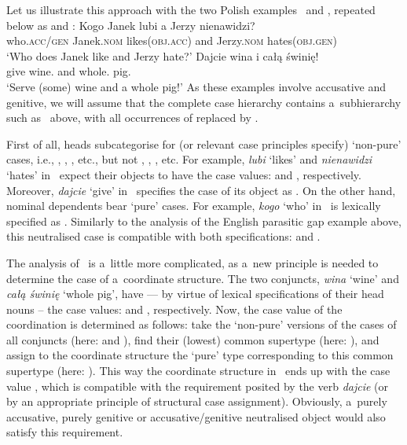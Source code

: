\documentclass[output=paper]{langsci/langscibook}
\begin{document}
Let us illustrate this approach with the two Polish examples~ and ,
repeated below as  and :
\eal
\ex
\label{ex:syn:pc:again} 
\gll Kogo Janek lubi a Jerzy nienawidzi? \\
     who.\textsc{acc/gen} Janek.\textsc{nom} likes(\textsc{obj.acc}) and Jerzy.\textsc{nom} hates(\textsc{obj.gen})\\\hspace{-6pt}
\glt  `Who does Janek like and Jerzy hate?’
\ex\label{ex:dis:pl:again}
\gll Dajcie wina i całą świnię! \\
    give wine.\GEN{} and whole.\ACC{} pig.\ACC{}\\
\glt `Serve (some) wine and a whole pig!’
\zl
As these examples involve accusative and genitive, we will assume that the complete case hierarchy contains a~subhierarchy such as~ above, with all occurrences of  replaced by .

First of all, heads subcategorise for (or relevant case principles specify) `non-pure’ cases, i.e., , , , etc., but not , , , etc.  For example, \emph{lubi} `likes’ and \emph{nienawidzi} `hates’ in~ expect their objects to have the case values:  and , respectively.  Moreover, \emph{dajcie} `give’ in~ specifies the case of its object as .  On the other hand, nominal dependents bear `pure’ cases.  For example, \emph{kogo} `who’ in~ is lexically specified as .  Similarly to the analysis of the English parasitic gap example above, this neutralised case is compatible with both specifications:  and .

The analysis of~ is a~little more complicated, as a~new principle is needed to determine the case of a~coordinate structure.  The two conjuncts, \emph{wina} `wine’ and \emph{całą świnię} `whole pig’, have — by virtue of lexical specifications of their head nouns – the case values:  and , respectively.  Now, the case value of the coordination is determined as follows: take the `non-pure’ versions of the cases of all conjuncts (here:  and ), find their (lowest) common supertype (here: ), and assign to the coordinate structure the `pure’ type corresponding to this common supertype (here: ).  This way the coordinate structure in~ ends up with the case value , which is compatible with the  requirement posited by the verb \emph{dajcie} (or by an appropriate principle of structural case assignment).  Obviously, a~purely accusative, purely genitive or accusative/genitive neutralised object would also satisfy this requirement.
\end{document}
